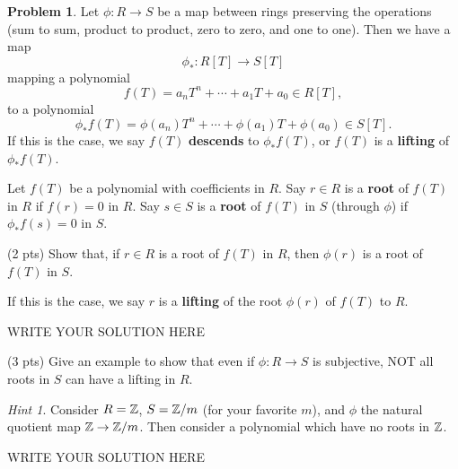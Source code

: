 \documentclass[11pt]{article}
\theoremstyle{plain}
\theoremstyle{definition}
\newtheorem{problem}{Problem}
\theoremstyle{remark}
\newtheorem*{hint}{Hint}
\numberwithin{equation}{problem}
\begin{document}
\begin{problem}
	Let $\phi\colon R\to S$ be a map between rings preserving the operations (sum to sum, product to product, zero to zero, and one to one). Then we have a map
	\[
		\phi_{\ast}\colon R[T]\longrightarrow S[T]
	\]
	mapping a polynomial 
	\[
		f(T) = a_nT^n + \cdots + a_1T + a_0 \in R[T],
	\]
	to a polynomial
	\[
		\phi_{\ast}f(T) = \phi(a_n)T^n + \cdots + \phi(a_1)T + \phi(a_0) \in S[T].
	\]
	If this is the case, we say $f(T)$ \textbf{descends} to $\phi_{\ast}f(T)$, or $f(T)$ is a \textbf{lifting} of $\phi_{\ast}f(T)$.

	Let $f(T)$ be a polynomial with coefficients in $R$. Say $r\in R$ is a \textbf{root} of $f(T)$ in $R$ if $f(r)=0$ in $R$. Say $s\in S$ is a \textbf{root} of $f(T)$ in $S$ (through $\phi$) if $\phi_{\ast}f(s)=0$ in $S$. 
	\begin{listinprob}
		\item (2 pts) Show that, if $r\in R$ is a root of $f(T)$ in $R$, then $\phi(r)$ is a root of $f(T)$ in $S$.
	\end{listinprob}
	If this is the case, we say $r$ is a \textbf{lifting} of the root $\phi(r)$ of $f(T)$ to $R$.
\begin{solution} %
WRITE YOUR SOLUTION HERE
\end{solution}\clearpage %

	\begin{listinprob}[resume]
		\item\label{p3.non-lifting} (3 pts) Give an example to show that even if $\phi\colon R\to S$ is subjective, NOT all roots in $S$ can have a lifting in $R$. 
		\begin{hint}
			Consider $R=\mathbb{Z}$, $S=\mathbb{Z}/m$ (for your favorite $m$), and $\phi$ the natural quotient map $\mathbb{Z}\to\mathbb{Z}/m$. Then consider a polynomial which have no roots in $\mathbb{Z}$.
		\end{hint}
	\end{listinprob}
\end{problem}
\begin{solution} %
WRITE YOUR SOLUTION HERE
\end{solution}\clearpage %
\end{document}
